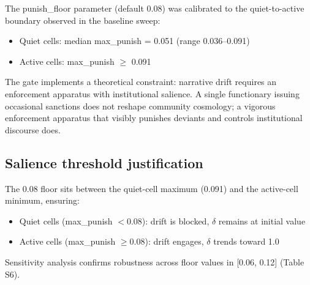\documentclass[12pt]{article}
\begin{document}
The punish\_floor parameter (default 0.08) was calibrated to the quiet-to-active boundary observed in the baseline sweep:
\begin{itemize}
\item Quiet cells: median max\_punish = 0.051 (range 0.036--0.091)
\item Active cells: max\_punish $\geq$ 0.091
\end{itemize}

The gate implements a theoretical constraint: narrative drift requires an enforcement apparatus with institutional salience. A single functionary issuing occasional sanctions does not reshape community cosmology; a vigorous enforcement apparatus that visibly punishes deviants and controls institutional discourse does.

\subsection{Salience threshold justification}

The 0.08 floor sits between the quiet-cell maximum (0.091) and the active-cell minimum, ensuring:
\begin{itemize}
\item Quiet cells (max\_punish $< 0.08$): drift is blocked, $\delta$ remains at initial value
\item Active cells (max\_punish $\geq 0.08$): drift engages, $\delta$ trends toward 1.0
\end{itemize}

Sensitivity analysis confirms robustness across floor values in [0.06, 0.12] (Table S6).
\end{document}
